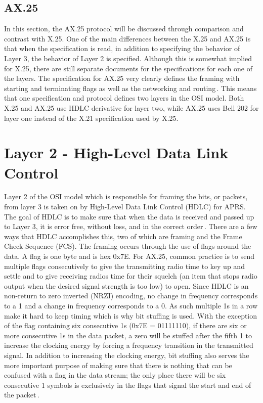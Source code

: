 \subsection{AX.25}
In this section, the AX.25 protocol will be discussed through comparison and contrast with X.25. One of the main differences between the X.25 and AX.25 is that when the specification is read, in addition to specifying the behavior of Layer 3, the behavior of Layer 2 is specified. Although this is somewhat implied for X.25, there are still separate documents for the specifications for each one of the layers. The specification for AX.25 very clearly defines the framing with starting and terminating flags as well as the networking and routing\,\cite{Beech1998}. This means that one specification and protocol defines two layers in the OSI model. Both X.25 and AX.25 use HDLC derivative for layer two, while AX.25 uses Bell 202 for layer one instead of the X.21 specification used by X.25.

\section{Layer 2 - High-Level Data Link Control}
Layer 2 of the OSI model which is responsible for framing the bits, or packets, from layer 3 is taken on by High-Level Data Link Control (HDLC) for APRS. The goal of HDLC is to make sure that when the data is received and passed up to Layer 3, it is error free, without loss, and in the correct order\,\cite{Javvin2006}. There are a few ways that HDLC accomplishes this, two of which are framing and the Frame Check Sequence (FCS). The framing occurs through the use of flags around the data. A flag is one byte and is hex 0x7E. For AX.25, common practice is to send multiple flags consecutively to give the transmitting radio time to key up and settle and to give receiving radios time for their squelch (an item that stops radio output when the desired signal strength is too low) to open. Since HDLC is an non-return to zero inverted (NRZI) encoding, no change in frequency corresponds to a 1 and a change in frequency corresponds to a 0. As such multiple 1s in a row make it hard to keep timing which is why bit stuffing is used. With the exception of the flag containing six consecutive 1s (0x7E = 01111110), if there are six or more consecutive 1s in the data packet, a zero will be stuffed after the fifth 1 to increase the clocking energy by forcing a frequency transition in the transmitted signal. In addition to increasing the clocking energy, bit stuffing also serves the more important purpose of making sure that there is nothing that can be confused with a flag in the data stream; the only place there will be six consecutive 1 symbols is exclusively in the flags that signal the start and end of the packet\,\cite{Horzepa1992}.

